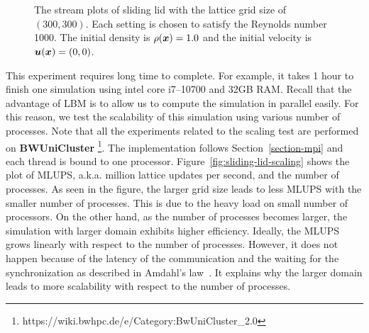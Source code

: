 \begin{figure}[t]
  \begin{center}
    \\
    \vspace{-3mm}
    \\
    \caption{The stream plots of sliding lid
    with the lattice grid size of $(300, 300)$.
    Each setting is chosen to satisfy the Reynolds number 1000.
    The initial density is $\rho(\boldsymbol{x}) = 1.0$ and the initial velocity is $\boldsymbol{u}(\boldsymbol{x}) = (0, 0)$.
      \label{fig:sliding-lid-velocity-evolution}}
  \end{center}
\end{figure}

This experiment requires long time to complete.
For example, it takes 1 hour to finish one simulation using
intel core i7--10700 and 32GB RAM.
Recall that the advantage of LBM is to allow us to compute the simulation in
parallel easily.
For this reason, we test the scalability of this simulation using
various number of processes.
Note that all the experiments related to the scaling test
are performed on {\bf BWUniCluster}
\footnote{https://wiki.bwhpc.de/e/Category:BwUniCluster\_2.0}.
The implementation follows Section~\ref{section-mpi}
and each thread is bound to one processor.
Figure~\ref{fig:sliding-lid-scaling} shows the plot of
MLUPS, a.k.a. million lattice updates per second, and
the number of processes.
As seen in the figure, the larger grid size leads to
less MLUPS with the smaller number of processes.
This is due to the heavy load on small number of processors.
On the other hand, as the number of processes
becomes larger, the simulation with larger domain exhibits
higher efficiency.
Ideally, the MLUPS grows linearly with respect to the number of processes.
However, it does not happen because of the latency of the communication
and the waiting for the synchronization as described in Amdahl's law~\cite{amdahl1967validity}.
It explains why the larger domain leads to more scalability with respect to
the number of processes.


